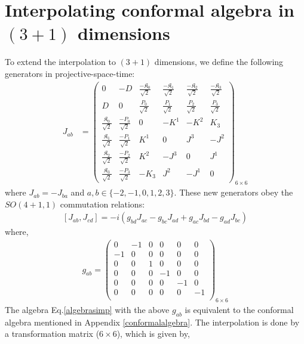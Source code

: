 \documentclass[%
 reprint,
superscriptaddress,
 amsmath,amssymb,
 aps,
]{revtex4-2}
\begin{document}
\section{Interpolating conformal algebra in \texorpdfstring{$(3+1)$}{Lg} dimensions}
\label{conformalsimpler}
To extend the interpolation to \texorpdfstring{$(3+1)$}{Lg} dimensions, we define the following generators \cite{Francesco,Blumenhagen} in projective-space-time:
\begin{align}\label{Jab}
  J_{ab}&=
  \begin{pmatrix}
  0&-D&\frac{-\mathfrak{K}_0}{\sqrt{2}}&\frac{-\mathfrak{K}_1}{\sqrt{2}}&\frac{-\mathfrak{K}_2}{\sqrt{2}}&\frac{-\mathfrak{K}_3}{\sqrt{2}}\\
  D&0&\frac{P_0}{\sqrt{2}}&\frac{P_1}{\sqrt{2}}&\frac{P_2}{\sqrt{2}}&\frac{P_3}{\sqrt{2}}\\
    \frac{\mathfrak{K}_0}{\sqrt{2}}&\frac{-P_0}{\sqrt{2}}&0 & -K^{1} & -K^{2} & K_3\\
    \frac{\mathfrak{K}_1}{\sqrt{2}}&\frac{-P_1}{\sqrt{2}}&K^{1} & 0 & J^{3} & -J^{2}\\
    \frac{\mathfrak{K}_2}{\sqrt{2}}&\frac{-P_2}{\sqrt{2}}&K^{2} & -J^{3} & 0 & J^{1}\\
    \frac{\mathfrak{K}_3}{\sqrt{2}}&\frac{-P_3}{\sqrt{2}}&-K_3 & J^{2} & -J^{1} & 0
  \end{pmatrix}_{6\times6}
\end{align}
where $J_{ab}=-J_{ba}$ and $a,b\in\{-2,-1,0,1,2,3\}$. These new generators obey the $SO(4+1,1)$ commutation relations:
  \begin{align}\label{algebrasimp}
      \left[J_{{a}{b}},J_{{c}{d}}\right]=-i\left(g_{{b}{d}}J_{{a}{c}}-g_{{b}{c}}J_{{a}{d}}+g_{{a}{c}}J_{{b}{d}}-g_{{a}{d}}J_{{b}{c}}\right)
  \end{align}
where, 
  \begin{align}\label{metric}
      g_{ab}=\begin{pmatrix}
  0&-1&0&0&0&0\\
  -1&0&0&0&0&0\\
  0&0&1&0&0&0\\
  0&0&0&-1&0&0\\
  0&0&0&0&-1&0\\
  0&0&0&0&0&-1\\
  \end{pmatrix}_{6\times6}
  \end{align}
The algebra Eq.\eqref{algebrasimp} with the above $g_{ab}$ is equivalent to the conformal algebra mentioned in Appendix \ref{conformalalgebra}. The interpolation is done by a transformation matrix ($6\times6$), which is given by,
\end{document}
